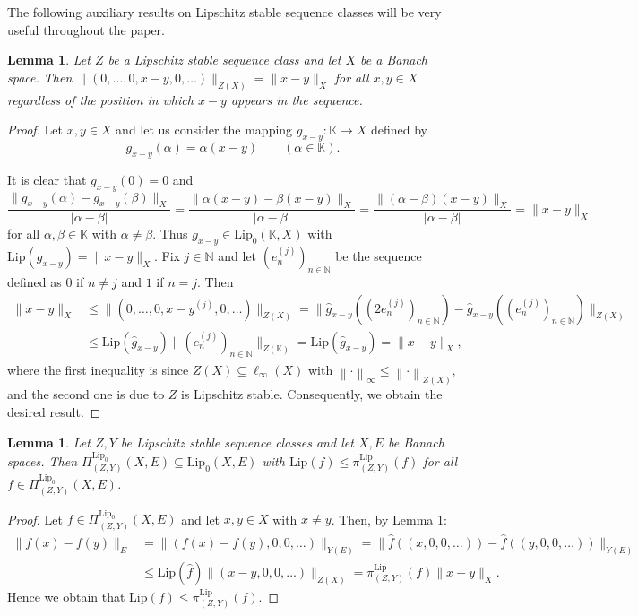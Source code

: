 \documentclass[12pt]{amsart}
\newtheorem{lemma}[theorem]{Lemma}
\def\N{\mathbb{N}}
\def\Lip{\mathrm{Lip}_0}
\def\Lipnorm{\mathrm{Lip}}
\begin{document}
The following auxiliary results on Lipschitz stable sequence classes will be very useful throughout the paper.

\begin{lemma}\label{Lem 5}
	Let $Z$ be a Lipschitz stable sequence class and let $X$ be a Banach space. Then $\|(0,\ldots,0,x-y,0,\ldots)\|_{Z(X)} = \|x-y\|_X$ for all $x,y \in X$ regardless of the position in which $x-y$ appears in the sequence.
\end{lemma}

\begin{proof}
	Let $x,y \in X$ and let us consider the mapping $g_{x-y}: \mathbb{K} \to X$ defined by
	$$
	g_{x-y}(\alpha) = \alpha(x-y) \qquad (\alpha \in \mathbb{K}).
	$$

	It is clear that $g_{x-y}(0)=0$ and
	$$
	\frac{\|g_{x-y}(\alpha)-g_{x-y}(\beta)\|_X}{|\alpha-\beta|} = \frac{\|\alpha(x-y)-\beta(x-y)\|_X}{|\alpha-\beta|} = \frac{\|(\alpha-\beta)(x-y)\|_X}{|\alpha-\beta|} = \|x-y\|_X
	$$
	for all $\alpha,\beta \in \mathbb{K}$ with $\alpha\neq \beta$. Thus $g_{x-y}\in\Lip(\mathbb{K},X)$ with $\Lipnorm(g_{x-y})=\|x-y\|_X$. Fix $j\in\N$ and let $(e_n^{(j)})_{n\in\N}$ be the sequence defined as $0$ if $n\neq j$ and $1$ if $n=j$. Then
	\begin{align*}
		\|x-y\|_X &\leq \|(0,\ldots, 0, x-y^{(j)},0,\ldots)\|_{Z(X)}=\|\hat{g}_{x-y}((2e_n^{(j)})_{n\in\N})-\hat{g}_{x-y}((e_n^{(j)})_{n\in\N})\|_{Z(X)}\\
		&\leq \Lipnorm(\hat{g}_{x-y})\|(e_n^{(j)})_{n\in\N}\|_{Z(\mathbb{K})}=\Lipnorm(\hat{g}_{x-y})=\|x-y\|_X,
	\end{align*}
	where the first inequality is since $Z(X) \subseteq \ell_\infty(X)$ with $\left\|\cdot\right\|_\infty \leq \left\|\cdot\right\|_{Z(X)}$, and the second one is due to $Z$ is Lipschitz stable. Consequently, we obtain the desired result.
\end{proof}

\begin{lemma}\label{Lem 6}
	Let $Z,Y$ be Lipschitz stable sequence classes and let $X,E$ be Banach spaces. Then $\Pi_{(Z,Y)}^{\Lip}(X,E)\subseteq \Lip(X,E)$ with $\Lipnorm(f) \leq \pi_{(Z,Y)}^{\Lipnorm}(f)$ for all $f \in \Pi_{(Z,Y)}^{\Lip}(X,E)$.
	
\end{lemma}

\begin{proof}
	Let $f \in \Pi_{(Z,Y)}^{\Lip}(X,E)$ and let $x,y\in X$ with $x\neq y$. Then, by Lemma \ref{Lem 5}:
	\begin{align*}
		\|f(x)-f(y)\|_E &= \|(f(x)-f(y),0,0,\ldots)\|_{Y(E)} = 
		\|\hat{f}((x,0,0,\ldots))-\hat{f}((y,0,0,\ldots))\|_{Y(E)}\\
		&\leq \Lipnorm(\hat{f})\|(x-y,0,0,\ldots)\|_{Z(X)} = \pi_{(Z,Y)}^{\Lipnorm}(f)\|x-y\|_X.
	\end{align*}
	Hence we obtain that $\Lipnorm(f) \leq \pi_{(Z,Y)}^{\Lipnorm}(f)$.
\end{proof}
\end{document}
